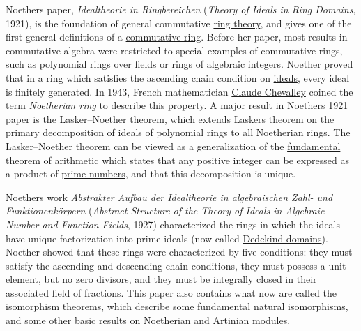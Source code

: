 Noether\textquotesingle s paper, \emph{Idealtheorie in Ringbereichen} (\emph{Theory of Ideals in Ring Domains}, 1921), is the foundation of general commutative \href{https://en.wikipedia.org/wiki/Ring_theory}{ring theory}, and gives one of the first general definitions of a \href{https://en.wikipedia.org/wiki/Commutative_ring}{commutative ring}. Before her paper, most results in commutative algebra were restricted to special examples of commutative rings, such as polynomial rings over fields or rings of algebraic integers. Noether proved that in a ring which satisfies the ascending chain condition on \href{https://en.wikipedia.org/wiki/Ideal_(ring_theory)}{ideals}, every ideal is finitely generated. In 1943, French mathematician \href{https://en.wikipedia.org/wiki/Claude_Chevalley}{Claude Chevalley} coined the term \emph{\href{https://en.wikipedia.org/wiki/Noetherian_ring}{Noetherian ring}} to describe this property. A major result in Noether\textquotesingle s 1921 paper is the \href{https://en.wikipedia.org/wiki/Lasker–Noether_theorem}{Lasker--Noether theorem}, which extends Lasker\textquotesingle s theorem on the primary decomposition of ideals of polynomial rings to all Noetherian rings. The Lasker--Noether theorem can be viewed as a generalization of the \href{https://en.wikipedia.org/wiki/Fundamental_theorem_of_arithmetic}{fundamental theorem of arithmetic} which states that any positive integer can be expressed as a product of \href{https://en.wikipedia.org/wiki/Prime_number}{prime numbers}, and that this decomposition is unique.

Noether\textquotesingle s work \emph{Abstrakter Aufbau der Idealtheorie in algebraischen Zahl- und Funktionenkörpern} (\emph{Abstract Structure of the Theory of Ideals in Algebraic Number and Function Fields}, 1927) characterized the rings in which the ideals have unique factorization into prime ideals (now called \href{https://en.wikipedia.org/wiki/Dedekind_domain}{Dedekind domains}). Noether showed that these rings were characterized by five conditions: they must satisfy the ascending and descending chain conditions, they must possess a unit element, but no \href{https://en.wikipedia.org/wiki/Zero_divisor}{zero divisors}, and they must be \href{https://en.wikipedia.org/wiki/Integrally_closed_domain}{integrally closed} in their associated field of fractions. This paper also contains what now are called the \href{https://en.wikipedia.org/wiki/Isomorphism_theorems}{isomorphism theorems}, which describe some fundamental \href{https://en.wikipedia.org/wiki/Natural_isomorphism}{natural isomorphisms}, and some other basic results on Noetherian and \href{https://en.wikipedia.org/wiki/Artinian_module}{Artinian modules}.



